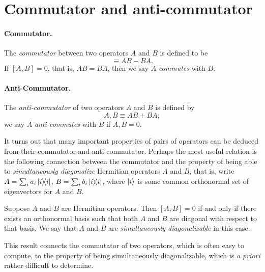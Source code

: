 \section{Commutator and anti-commutator}

\paragraph{Commutator.} The \emph{commutator} between two operators $A$ and $B$
is defined to be \begin{equation}
  [A, B] \equiv AB - BA. \label{eq:comm}
\end{equation}
If $[A, B] = 0$, that is, $AB = BA$, then we say $A$ \emph{commutes} with $B$.

\paragraph{Anti-Commutator.} The \emph{anti-commutator} of two operators $A$
and $B$ is defined by \begin{equation}
  {A, B} \equiv AB + BA; \label{eq:anti-comm}
\end{equation}
we say $A$ \emph{anti-commutes} with $B$ if ${A, B} = 0$.

It turns out that many important properties of pairs of operators can be
deduced from their commutator and anti-commutator. Perhaps the most useful
relation is the following connection between the commutator and the property
of being able to \emph{simultaneously diagonalize} Hermitian operators $A$ and
$B$, that is, write $A = \sum_i a_i\ketbra{i}{i}$, $B = \sum_i b_i\ketbra{i}{i}
$, where $\ket{i}$ is some common orthonormal set of eigenvectors for $A$ and
$B$.

\begin{theorem}
  Suppose $A$ and $B$ are Hermitian operators. Then $[A, B] = 0$ if and only if
  there exists an orthonormal basis such that both $A$ and $B$ are diagonal
  with respect to that basis. We say that $A$ and $B$ are \emph{simultaneously
  diagonalizable} in this case.
\end{theorem}

This result connects the commutator of two operators, which is often easy to
compute, to the property of being simultaneously diagonalizable, which is
\emph{a priori} rather difficult to determine.

